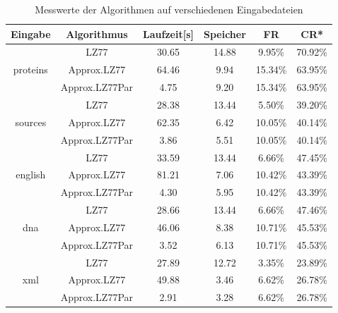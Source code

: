 \begin{table}[ht]
    \centering
    \caption{Messwerte der Algorithmen auf verschiedenen Eingabedateien}
    \begin{tabular} { |c|c|c|c|c|c| }
        \hline
        \textbf{Eingabe} & \textbf{Algorithmus} & \textbf{Laufzeit[s]} & \textbf{Speicher} & \textbf{FR} & \textbf{CR*} \\
        \hline
        & LZ77 & 30.65 & 14.88 & 9.95\% & 70.92\% \\
        proteins & Approx.LZ77 & 64.46 & 9.94 & 15.34\% & 63.95\% \\
        & Approx.LZ77Par & 4.75 & 9.20 & 15.34\% & 63.95\% \\
        \hline
        & LZ77 & 28.38 & 13.44 & 5.50\% & 39.20\% \\
        sources & Approx.LZ77 & 62.35 & 6.42 & 10.05\% & 40.14\% \\
        & Approx.LZ77Par & 3.86 & 5.51 & 10.05\% & 40.14\% \\
        \hline
        & LZ77 & 33.59 & 13.44 & 6.66\% & 47.45\% \\
        english & Approx.LZ77 & 81.21 & 7.06 & 10.42\% & 43.39\% \\
        & Approx.LZ77Par & 4.30 & 5.95 & 10.42\% & 43.39\% \\
        \hline
        & LZ77 & 28.66 & 13.44 & 6.66\% & 47.46\% \\
        dna & Approx.LZ77 & 46.06 & 8.38 & 10.71\% & 45.53\% \\
        & Approx.LZ77Par & 3.52 & 6.13 & 10.71\% & 45.53\% \\
        \hline
        & LZ77 & 27.89 & 12.72 & 3.35\% & 23.89\% \\
        xml & Approx.LZ77 & 49.88 & 3.46 & 6.62\% & 26.78\% \\
        & Approx.LZ77Par & 2.91 & 3.28 & 6.62\% & 26.78\% \\
        \hline
    \end{tabular}
\end{table}